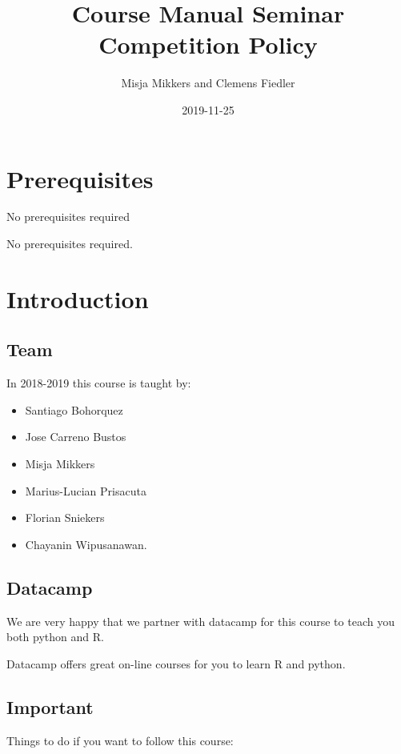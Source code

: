 \documentclass[]{book}
\title{Course Manual Seminar Competition Policy}
\author{Misja Mikkers and Clemens Fiedler}
\date{2019-11-25}
\providecommand{\tightlist}{%
  \setlength{\itemsep}{0pt}\setlength{\parskip}{0pt}}
\begin{document}
\maketitle

{
\setcounter{tocdepth}{1}
\tableofcontents
}
\chapter{Prerequisites}\label{prerequisites}

No prerequisites required

No prerequisites required.

\chapter{Introduction}\label{intro}

\section{Team}\label{team}

In 2018-2019 this course is taught by:

\begin{itemize}
\tightlist
\item
  Santiago Bohorquez
\item
  Jose Carreno Bustos
\item
  Misja Mikkers
\item
  Marius-Lucian Prisacuta
\item
  Florian Sniekers
\item
  Chayanin Wipusanawan.
\end{itemize}

\section{Datacamp}\label{datacamp}

We are very happy that we partner with datacamp for this course to teach
you both python and R.

Datacamp offers great on-line courses for you to learn R and python.

\section{Important}\label{important}

Things to do if you want to follow this course:
\end{document}
